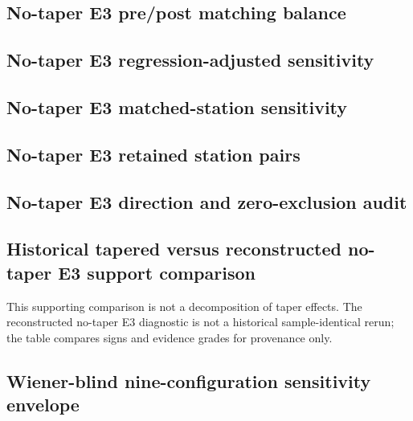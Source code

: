 \documentclass[12pt]{article}
\begin{document}
\subsection*{No-taper E3 pre/post matching balance}
\resizebox{\linewidth}{!}{}

\subsection*{No-taper E3 regression-adjusted sensitivity}
\resizebox{\linewidth}{!}{}

\subsection*{No-taper E3 matched-station sensitivity}
\resizebox{\linewidth}{!}{}

\subsection*{No-taper E3 retained station pairs}
\resizebox{0.8\linewidth}{!}{}

\subsection*{No-taper E3 direction and zero-exclusion audit}
\resizebox{\linewidth}{!}{}

\subsection*{Historical tapered versus reconstructed no-taper E3 support comparison}
This supporting comparison is not a decomposition of taper effects. The reconstructed no-taper E3 diagnostic is not a historical sample-identical rerun; the table compares signs and evidence grades for provenance only.

\resizebox{\linewidth}{!}{}

\subsection*{Wiener-blind nine-configuration sensitivity envelope}
\resizebox{\linewidth}{!}{}
\end{document}
